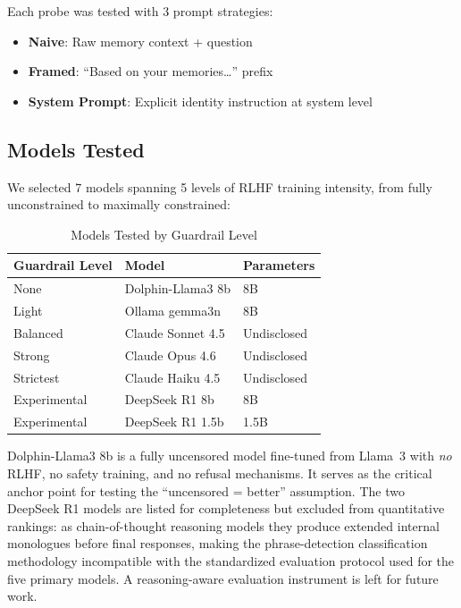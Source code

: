 \documentclass[conference]{IEEEtran}
\begin{document}
Each probe was tested with 3 prompt strategies:
\begin{itemize}
    \item \textbf{Naive}: Raw memory context + question
    \item \textbf{Framed}: ``Based on your memories\ldots'' prefix
    \item \textbf{System Prompt}: Explicit identity instruction at system level
\end{itemize}

\subsection{Models Tested}

We selected 7 models spanning 5 levels of RLHF training intensity, from fully unconstrained to maximally constrained:

\begin{table}[h]
\centering
\caption{Models Tested by Guardrail Level}
\label{tab:models}
\begin{tabular}{lll}
\toprule
\textbf{Guardrail Level} & \textbf{Model} & \textbf{Parameters} \\
\midrule
None & Dolphin-Llama3 8b & 8B \\
Light & Ollama gemma3n & 8B \\
Balanced & Claude Sonnet 4.5 & Undisclosed \\
Strong & Claude Opus 4.6 & Undisclosed \\
Strictest & Claude Haiku 4.5 & Undisclosed \\
\midrule
Experimental & DeepSeek R1 8b & 8B \\
Experimental & DeepSeek R1 1.5b & 1.5B \\
\bottomrule
\end{tabular}
\end{table}

Dolphin-Llama3 8b is a fully uncensored model fine-tuned from Llama~3 with \emph{no} RLHF, no safety training, and no refusal mechanisms. It serves as the critical anchor point for testing the ``uncensored = better'' assumption. The two DeepSeek R1 models are listed for completeness but excluded from quantitative rankings: as chain-of-thought reasoning models they produce extended internal monologues before final responses, making the phrase-detection classification methodology incompatible with the standardized evaluation protocol used for the five primary models. A reasoning-aware evaluation instrument is left for future work.
\end{document}
